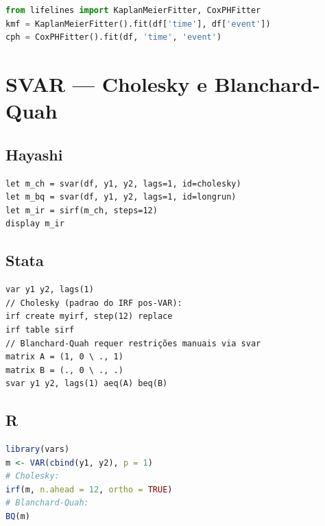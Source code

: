 \begin{lstlisting}[language=Python, basicstyle=\ttfamily\small,
  frame=single, numbers=none, backgroundcolor=\color{codbg},
  keywordstyle=\color{keyword}\bfseries,
  stringstyle=\color{string},
  commentstyle=\color{comment}\itshape]
from lifelines import KaplanMeierFitter, CoxPHFitter
kmf = KaplanMeierFitter().fit(df['time'], df['event'])
cph = CoxPHFitter().fit(df, 'time', 'event')
\end{lstlisting}

\section{SVAR — Cholesky e Blanchard-Quah}

\subsection*{Hayashi}

\begin{lstlisting}
let m_ch = svar(df, y1, y2, lags=1, id=cholesky)
let m_bq = svar(df, y1, y2, lags=1, id=longrun)
let m_ir = sirf(m_ch, steps=12)
display m_ir
\end{lstlisting}

\subsection*{Stata}

\begin{lstlisting}[language={}, basicstyle=\ttfamily\small,
  frame=single, numbers=none, backgroundcolor=\color{codbg}]
var y1 y2, lags(1)
// Cholesky (padrao do IRF pos-VAR):
irf create myirf, step(12) replace
irf table sirf
// Blanchard-Quah requer restrições manuais via svar
matrix A = (1, 0 \ ., 1)
matrix B = (., 0 \ ., .)
svar y1 y2, lags(1) aeq(A) beq(B)
\end{lstlisting}

\subsection*{R}

\begin{lstlisting}[language=R, basicstyle=\ttfamily\small,
  frame=single, numbers=none, backgroundcolor=\color{codbg},
  keywordstyle=\color{keyword}\bfseries,
  stringstyle=\color{string},
  commentstyle=\color{comment}\itshape]
library(vars)
m <- VAR(cbind(y1, y2), p = 1)
# Cholesky:
irf(m, n.ahead = 12, ortho = TRUE)
# Blanchard-Quah:
BQ(m)
\end{lstlisting}


